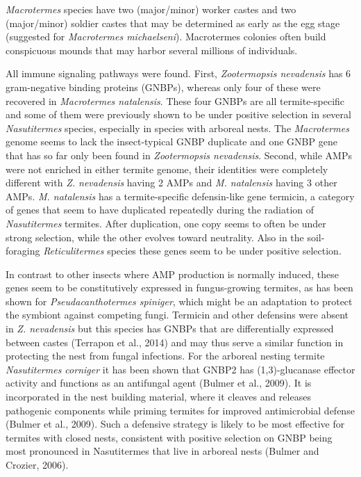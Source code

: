 \documentclass[11pt]{article}
\begin{document}
\begin{sloppypar}
\textit{Macrotermes} species have two (major/minor) worker castes and two (major/minor) soldier castes that may be determined as early as the egg stage (suggested for \textit{Macrotermes michaelseni}). 
Macrotermes colonies often build conspicuous mounds that may harbor several millions of individuals.
\par
All immune signaling pathways were found. 
First, \textit{Zootermopsis nevadensis} has 6 gram-negative binding proteins (GNBPs), whereas only four of these were recovered in \textit{Macrotermes natalensis}. 
These four GNBPs are all termite-specific and some of them were previously shown to be under positive selection in several \textit{Nasutitermes} species, especially in species with arboreal nests. 
The \textit{Macrotermes} genome seems to lack the insect-typical GNBP duplicate and one GNBP gene that has so far only been found in \textit{Zootermopsis nevadensis}. 
Second, while AMPs were not enriched in either termite genome, their identities were completely different with \textit{Z. nevadensis} having 2 AMPs and \textit{M. natalensis} having 3 other AMPs. 
\textit{M. natalensis} has a termite-specific defensin-like gene termicin, a category of genes that seem to have duplicated repeatedly during the radiation of \textit{Nasutitermes} termites. 
After duplication, one copy seems to often be under strong selection, while the other evolves toward neutrality. 
Also in the soil-foraging \textit{Reticulitermes} species these genes seem to be under positive selection.
\par
In contrast to other insects where AMP production is normally induced, these genes seem to be constitutively expressed in fungus-growing termites, as has been shown for \textit{Pseudacanthotermes spiniger}, which might be an adaptation to protect the symbiont against competing fungi. 
Termicin and other defensins were absent in \textit{Z. nevadensis} but this species has GNBPs that are differentially expressed between castes (Terrapon et al., 2014) and may thus serve a similar function in protecting the nest from fungal infections. 
For the arboreal nesting termite \textit{Nasutitermes corniger} it has been shown that GNBP2 has (1,3)-glucanase effector activity and functions as an antifungal agent (Bulmer et al., 2009). 
It is incorporated in the nest building material, where it cleaves and releases pathogenic components while priming termites for improved antimicrobial defense (Bulmer et al., 2009). 
Such a defensive strategy is likely to be most effective for termites with closed nests, consistent with positive selection on GNBP being most pronounced in Nasutitermes that live in arboreal nests (Bulmer and Crozier, 2006). 

\end{sloppypar}
\end{document}
